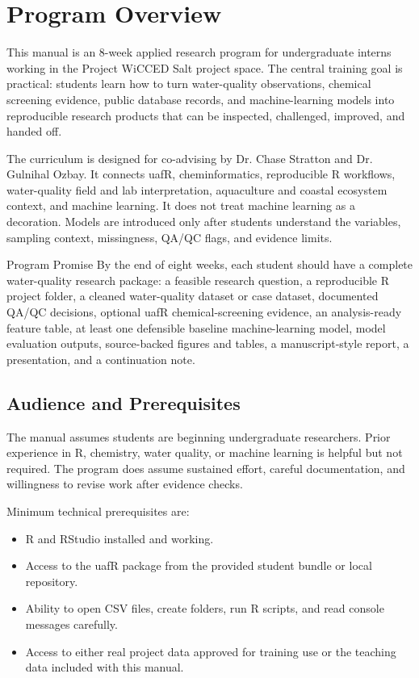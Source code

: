 \chapter{Program Overview}

This manual is an 8-week applied research program for undergraduate interns working in the Project WiCCED Salt project space. The central training goal is practical: students learn how to turn water-quality observations, chemical screening evidence, public database records, and machine-learning models into reproducible research products that can be inspected, challenged, improved, and handed off.

The curriculum is designed for co-advising by Dr. Chase Stratton and Dr. Gulnihal Ozbay. It connects uafR, cheminformatics, reproducible R workflows, water-quality field and lab interpretation, aquaculture and coastal ecosystem context, and machine learning. It does not treat machine learning as a decoration. Models are introduced only after students understand the variables, sampling context, missingness, QA/QC flags, and evidence limits.

\begin{programbox}{Program Promise}
By the end of eight weeks, each student should have a complete water-quality research package: a feasible research question, a reproducible R project folder, a cleaned water-quality dataset or case dataset, documented QA/QC decisions, optional uafR chemical-screening evidence, an analysis-ready feature table, at least one defensible baseline machine-learning model, model evaluation outputs, source-backed figures and tables, a manuscript-style report, a presentation, and a continuation note.
\end{programbox}

\section{Audience and Prerequisites}

The manual assumes students are beginning undergraduate researchers. Prior experience in R, chemistry, water quality, or machine learning is helpful but not required. The program does assume sustained effort, careful documentation, and willingness to revise work after evidence checks.

Minimum technical prerequisites are:
\begin{itemize}
  \item R and RStudio installed and working.
  \item Access to the uafR package from the provided student bundle or local repository.
  \item Ability to open CSV files, create folders, run R scripts, and read console messages carefully.
  \item Access to either real project data approved for training use or the teaching data included with this manual.
\end{itemize}

